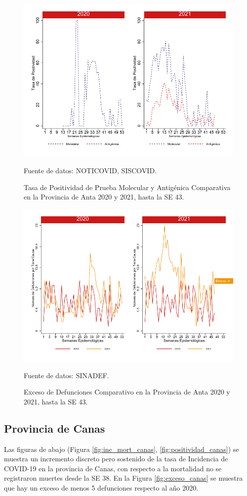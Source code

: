 \documentclass[12pt,a4paper,openany]{book}
\begin{document}
		\begin{figure}[h]
			\caption{Tasa de Positividad de Prueba Molecular y Antigénica Comparativa en la Provincia de Anta 2020 y 2021, hasta la SE 43.}\label{fig:positividad_anta}
			\begin{center}
				\includegraphics[width=0.7\linewidth]{../figuras/positividad_20_21_2}
			\end{center}
			{\footnotesize {Fuente de datos: NOTICOVID, SISCOVID.}}
		\end{figure}
		
		\begin{figure}[h]
			\caption{Exceso de Defunciones Comparativo en la Provincia de Anta  2020 y 2021, hasta la SE 43.}\label{fig:exceso_anta}
			\begin{center}
				\includegraphics[width=0.7\linewidth]{../figuras/exceso_2}
			\end{center}
			{\footnotesize {Fuente de datos: SINADEF.}}
		\end{figure}
		
		\clearpage
		
		\subsection*{Provincia de Canas}
		\noindent Las figuras de abajo (Figura \ref{fig:inc_mort_canas}, \ref{fig:positividad_canas}) se muestra un incremento discreto pero sostenido de la tasa de Incidencia de COVID-19 en la provincia de Canas, con respecto a la mortalidad no se registraron muertes desde la SE 38. En la Figura \ref{fig:exceso_canas} se muestra que hay un exceso de menos 5 defunciones respecto al año 2020.
		
\end{document}
